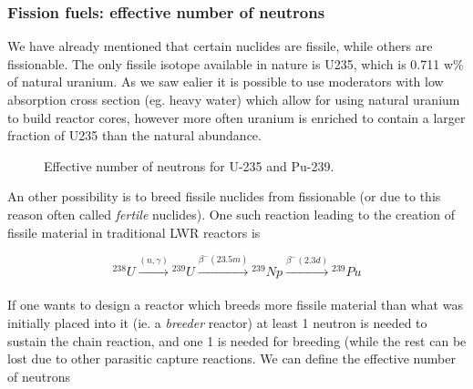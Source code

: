 \subsubsection*{Fission fuels: effective number of neutrons}

We have already mentioned that certain nuclides are fissile, while others are fissionable. The only fissile isotope available in nature is U235, which is 0.711 w\% of natural uranium. As we saw ealier it is possible to use moderators with low absorption cross section (eg. heavy water) which allow for using natural uranium to build reactor cores, however more often uranium is enriched to contain a larger fraction of U235 than the natural abundance.

\begin{figure}[ht!]
\protect {}\protect
\caption{\label{fig:eta} \footnotesize{Effective number of neutrons for U-235 and Pu-239.}}
\end{figure}

An other possibility is to breed fissile nuclides from fissionable (or due to this reason often called \textit{fertile} nuclides). One such reaction leading to the creation of fissile material in traditional LWR reactors is

\begin{equation}
{}^{238}U\xrightarrow[]{(n,\gamma)}{}^{239}U\xrightarrow[]{\beta^-(23.5m)}{}^{239}Np\xrightarrow[]{\beta^-(2.3d)} {}^{239}Pu
\end{equation}

If one wants to design a reactor which breeds more fissile material than what was initially placed into it (ie. a \textit{breeder} reactor) at least 1 neutron is needed to sustain the chain reaction, and one 1 is needed for breeding (while the rest can be lost due to other parasitic capture reactions. We can define the effective number of neutrons

